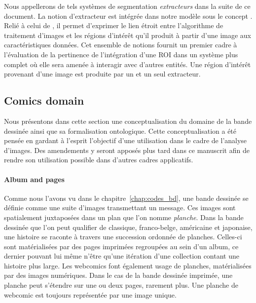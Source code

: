 Nous appellerons de tels systèmes de segmentation \textit{extracteurs} dans la suite de ce document.
La notion d'extracteur est intégrée dans notre modèle sous le concept .
Relié à celui de , il permet d'exprimer le lien étroit entre l'algorithme de traitement d'images et les régions d'intérêt qu'il produit à partir d'une image aux caractéristiques données.
Cet ensemble de notions fournit un premier cadre à l'évaluation de la pertinence de l'intégration d'une ROI dans un système plus complet où elle sera amenée à interagir avec d'autres entités.
Une région d'intérêt provenant d'une image est produite par un et un seul extracteur.

\subsection{Comics domain} %
\label{sub:comics_domain}
Nous présentons dans cette section une conceptualisation du domaine de la bande dessinée ainsi que sa formalisation ontologique.
Cette conceptualisation a été pensée en gardant à l'esprit l'objectif d'une utilisation dans le cadre de l'analyse d'images.
Des amendements y seront apposés plus tard dans ce manuscrit afin de rendre son utilisation possible dans d'autres cadres applicatifs.

\paragraph{Album and pages} %
\label{par:album_and_pages}
Comme nous l'avons vu dans le chapitre~\ref{chap:codes_bd}, une bande dessinée se définie comme une suite d'images transmettant un message.
Ces images sont spatialement juxtaposées dans un plan que l'on nomme \emph{planche}.
Dans la bande dessinée que l'on peut qualifier de classique, franco-belge, américaine et japonaise, une histoire se raconte à travers une succession ordonnée de planches.
Celles-ci sont matérialisées par des pages imprimées regroupées au sein d'un album, ce dernier pouvant lui même n'être qu'une itération d'une collection contant une histoire plus large.
Les webcomics font également usage de planches, matérialisées par des images numériques.
Dans le cas de la bande dessinée imprimée, une planche peut s'étendre sur une ou deux pages, rarement plus.
Une planche de webcomic est toujours représentée par une image unique.


